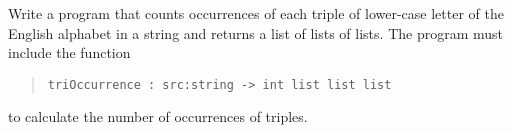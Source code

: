 \label{triocurrence}
Write a program that counts occurrences of each triple of lower-case
letter of the English alphabet in a string and returns a list of lists
of lists. The program must include the function
\begin{quote}
  \mbox{\lstinline!triOccurrence : src:string -> int list list list!}
\end{quote}
to calculate the number of occurrences of triples.